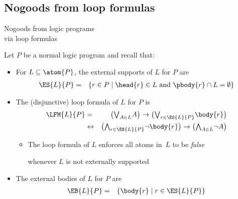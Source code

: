 \subsection{Nogoods from loop formulas}
\begin{frame}{Nogoods from logic programs\\[-1ex]\normalsize via loop formulas}

  Let $P$ be a normal logic program and recall that:
  \begin{itemize}
  \item <1->
    For $L\subseteq\atom{P}$,
    the external supports of $L$ for $P$ are
    \begin{eqnarray*}
      \ES{L}{P}
      & = &
      \{r\in P\mid\head{r}\in L \text{ and } \pbody{r}\cap L=\emptyset\}
    \end{eqnarray*}

  \item <2->
    The (disjunctive) loop formula of $L$ for $P$ is
    \begin{eqnarray*}
      \LFM{L}{P}
      & = &
      \big(
      \mbox{$\bigvee_{A\in L}$} A
      \big)
      \rightarrow
      \big(
      \mbox{$\bigvee_{r\in\ES{L}{P}}$}
      {\body{r}}
      \big)
      \\
      & \leftrightarrow &
      \big(
      \mbox{$\bigwedge_{r\in\ES{L}{P}}$}
      \neg%
      {\body{r}}
      \big)
      \rightarrow
      \big(
      \mbox{$\bigwedge_{A\in L}$}\neg A
      \big)
    \end{eqnarray*}
    \vspace*{-4mm}
    \begin{itemize}
    \item {}
      The loop formula of $L$ enforces
      all atoms in~$L$ to be \emph{false}
      \par
      whenever $L$ is not externally supported
    \end{itemize}

  \item <3-> The external bodies of $L$ for $P$ are
    \begin{eqnarray*}
      \EB{L}{P} & = & \{\body{r} \mid r\in \ES{L}{P}\}
    \end{eqnarray*}
  \end{itemize}
\end{frame}
